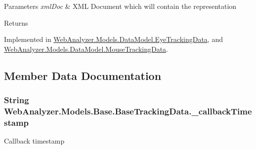 \begin{DoxyParams}{Parameters}
{\em xml\+Doc} & X\+M\+L Document which will contain the representation\\
\hline
\end{DoxyParams}
\begin{DoxyReturn}{Returns}

\end{DoxyReturn}


Implemented in \hyperlink{class_web_analyzer_1_1_models_1_1_data_model_1_1_eye_tracking_data_a1c9442c2b205d50095519102069ad2cd}{Web\+Analyzer.\+Models.\+Data\+Model.\+Eye\+Tracking\+Data}, and \hyperlink{class_web_analyzer_1_1_models_1_1_data_model_1_1_mouse_tracking_data_ac1af00e598088574f90d7431888af2e3}{Web\+Analyzer.\+Models.\+Data\+Model.\+Mouse\+Tracking\+Data}.



\subsection{Member Data Documentation}
\hypertarget{class_web_analyzer_1_1_models_1_1_base_1_1_base_tracking_data_a97cfad26e3a27a528776bcccbe7da68d}{}
\subsubsection[{\+\_\+callback\+Timestamp}]{\setlength{\rightskip}{0pt plus 5cm}String Web\+Analyzer.\+Models.\+Base.\+Base\+Tracking\+Data.\+\_\+callback\+Timestamp\hspace{0.3cm}{\ttfamily [protected]}}\label{class_web_analyzer_1_1_models_1_1_base_1_1_base_tracking_data_a97cfad26e3a27a528776bcccbe7da68d}


Callback timestamp 

\hypertarget{class_web_analyzer_1_1_models_1_1_base_1_1_base_tracking_data_a38d492dc01a8dbba23ec635874808081}{}
